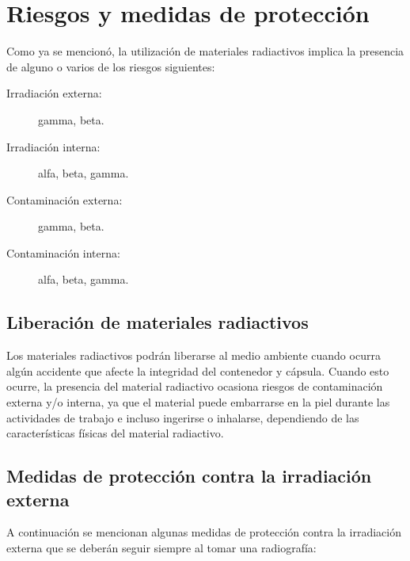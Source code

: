 \chapter{Riesgos y medidas de protección}

Como ya se mencionó, la utilización de materiales radiactivos implica la presencia de alguno o varios de los riesgos siguientes:

\begin{description}
  \item[Irradiación externa:] gamma, beta.
  \item[Irradiación interna:] alfa, beta, gamma.
  \item[Contaminación externa:] gamma, beta.
  \item[Contaminación interna:] alfa, beta, gamma.
\end{description}

\section{Liberación de materiales radiactivos}

Los materiales radiactivos podrán liberarse al medio ambiente cuando ocurra algún accidente que afecte la integridad del contenedor y cápsula. Cuando esto ocurre, la presencia del material radiactivo ocasiona riesgos de contaminación externa y/o interna, ya que el material puede embarrarse en la piel durante las actividades de trabajo e incluso ingerirse o inhalarse, dependiendo de las características físicas del material radiactivo.

\section{Medidas de protección contra la irradiación externa}

A continuación se mencionan algunas medidas de protección contra la irradiación externa que se deberán seguir siempre al tomar una radiografía:

